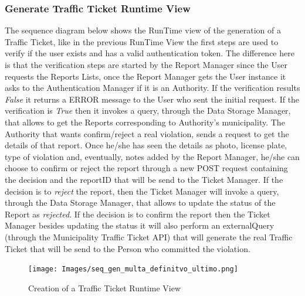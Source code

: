 \subsubsection{Generate Traffic Ticket Runtime View}
The sequence diagram below shows the RunTime view of the generation of a Traffic Ticket, like in the previous RunTime View the first steps are used to verify if the user exists and has a valid authentication token. The difference here is that the verification steps are started by the Report Manager since the User requests the Reports Lists, once the Report Manager gets the User instance it asks to the Authentication Manager if it is an Authority. If the verification results \textit{False} it returns a ERROR message to the User who sent the initial request. If the verification is \textit{True} then it invokes a query, through the Data Storage Manager, that allows to get the Reports corresponding to Authority's municipality.\newline
The Authority that wants confirm/reject a real violation, sends a request to get the details of that report. Once he/she has seen the details as photo, license plate, type of violation and, eventually, notes added by the Report Manager, he/she can choose to confirm or reject the report through a new POST request containing the decision and the reportID that will be send to the Ticket Manager.\newline
If the decision is to \textit{reject} the report, then the Ticket Manager will invoke a query, through the Data Storage Manager, that allows to update the status of the Report as \textit{rejected}. If the decision is to confirm the report then the Ticket Manager besides updating the status it will also perform an externalQuery (through the Municipality Traffic Ticket API) that will generate the real Traffic Ticket that will be send to the Person who committed the violation.\newline 
\begin{figure}[H]
          \texttt{[image: Images/seq\_gen\_multa\_definitvo\_ultimo.png]}
        \caption{Creation of a Traffic Ticket Runtime View}
\end{figure}

